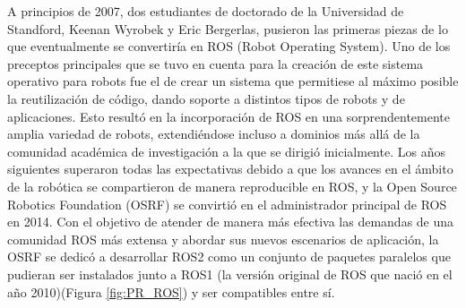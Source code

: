 A principios de 2007, dos estudiantes de doctorado de la Universidad de Standford, Keenan Wyrobek y Eric Bergerlas, pusieron las primeras piezas de lo que eventualmente se convertiría en ROS (Robot Operating System). Uno de los preceptos principales que se tuvo en cuenta para la creación de este sistema operativo para robots fue el de crear un sistema que permitiese al máximo posible la reutilización de código, dando soporte a distintos tipos de robots y de aplicaciones. Esto resultó en la incorporación de ROS en una sorprendentemente amplia variedad de robots, extendiéndose incluso a dominios más allá de la comunidad académica de investigación a la que se dirigió inicialmente. Los años siguientes superaron todas las expectativas debido a que los avances en el ámbito de la robótica se compartieron de manera reproducible en ROS, y la Open Source Robotics Foundation (OSRF) se convirtió en el administrador principal de ROS en 2014. Con el objetivo de atender de manera más efectiva las demandas de una comunidad ROS más extensa y abordar sus nuevos escenarios de aplicación, la OSRF se dedicó a desarrollar ROS2 como un conjunto de paquetes paralelos que pudieran ser instalados junto a ROS1 (la versión original de ROS que nació en el año 2010)(Figura \ref{fig:PR_ROS}) y ser compatibles entre sí. %
  
